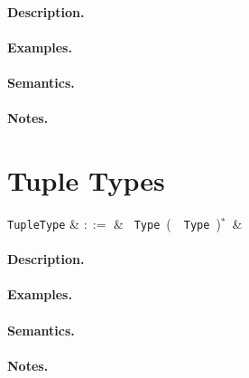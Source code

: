\paragraph{Description.}

\paragraph{Examples.}

\paragraph{Semantics.}

\paragraph{Notes.} 


\section{Tuple Types}

\begin{syntax}
  \verb+TupleType+ & $::=$ & \token{(}\ \verb+Type+\ \big(\ \token{,}\
  \verb+Type+\ \big)$^*$\ \token{)}&\\
\end{syntax}

\paragraph{Description.}

\paragraph{Examples.}

\paragraph{Semantics.}

\paragraph{Notes.}


